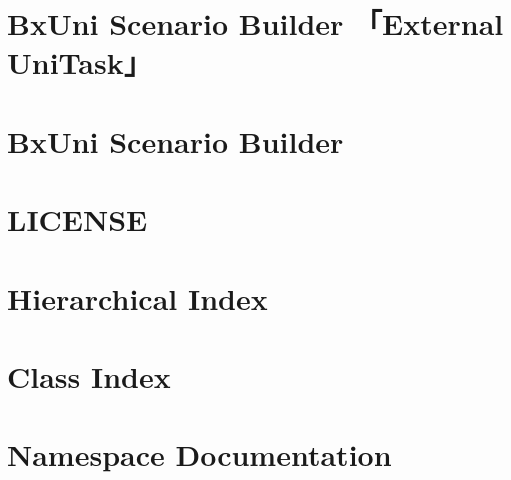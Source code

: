 \documentclass[twoside]{book}
\newcommand{\+}{\discretionary{\mbox{\scriptsize$\hookleftarrow$}}{}{}}
\begin{document}
\begin{CJK}{UTF8}{min}
\chapter{Bx\+Uni Scenario Builder 「\+External Uni\+Task」}
\label{md__c__home_murakami__b_x_tools__bx_uni__scenario_builder__packages__bx_uni__scenario_builder__documents___external__uni_task}

\chapter{Bx\+Uni Scenario Builder}
\label{md__c__home_murakami__b_x_tools__bx_uni__scenario_builder__packages__bx_uni__scenario_builder__documents__index}

\chapter{LICENSE}
\label{md__c__home_murakami__b_x_tools__bx_uni__scenario_builder__packages__bx_uni__scenario_builder__l_i_c_e_n_s_e}

\chapter{Hierarchical Index}

\chapter{Class Index}

\chapter{Namespace Documentation}






\end{CJK}
\end{document}
